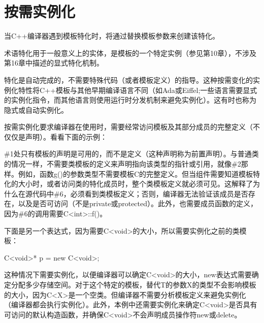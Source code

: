 \section{按需实例化}
当C++编译器遇到模板特化时，将通过替换模板参数来创建该特化。

\begin{notice}
术语特化用于一般意义上的实体，是模板的一个特定实例（参见第10章），不涉及第16章中描述的显式特化机制。
\end{notice}

特化是自动完成的，不需要特殊代码（或者模板定义）的指导。这种按需变化的实例化特性将C++模板与其他早期编译语言不同（如Ada或Eiffel;一些语言需要显式的实例化指令，而其他语言则使用运行时分发机制来避免实例化）。这有时也称为隐式或自动实例化。

按需实例化要求编译器在使用时，需要经常访问模板及其部分成员的完整定义（不仅仅是声明）。看看下面的示例：


\#1处只有模板的声明是可用的，而不是定义（这种声明称为前置声明）。与普通类的情况一样，不需要类模板的定义来声明指向该类型的指针或引用，就像\#2那样。例如，函数g()的参数类型不需要模板C的完整定义。但当组件需要知道模板特化的大小时，或者访问类的特化成员时，整个类模板定义就必须可见。这解释了为什么在源代码中\#6，必须看到类模板定义；否则，编译器无法验证该成员是否存在，以及是否可访问（不是private或protected）。此外，也需要成员函数的定义，因为\#6的调用需要C<int>::f()。

下面是另一个表达式，因为需要C<void>的大小，所以需要实例化之前的类模板：

\begin{cpp}
C<void>* p = new C<void>;
\end{cpp}

这种情况下需要实例化，以便编译器可以确定C<void>的大小，new表达式需要确定分配多少存储空间。对于这个特定的模板，替代T的参数X的类型不会影响模板的大小，因为C<X>是一个空类。但编译器不需要分析模板定义来避免实例化（编译器都会执行实例化）。此外，本例中还需要实例化来确定C<void>是否具有可访问的默认构造函数，并确保C<void>不会声明成员操作符new或delete。

